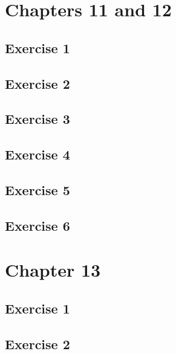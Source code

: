 \documentclass[a4paper,12pt,oneside]{book}
\begin{document}
\hypertarget{chapters-11-and-12}{%
\section{Chapters 11 and 12}\label{chapters-11-and-12}}

\hypertarget{exercise-1-6}{%
\subsection{Exercise 1}\label{exercise-1-6}}

\hypertarget{exercise-2-6}{%
\subsection{Exercise 2}\label{exercise-2-6}}

\hypertarget{exercise-3-6}{%
\subsection{Exercise 3}\label{exercise-3-6}}

\hypertarget{exercise-4-4}{%
\subsection{Exercise 4}\label{exercise-4-4}}

\hypertarget{exercise-5-2}{%
\subsection{Exercise 5}\label{exercise-5-2}}

\hypertarget{exercise-6-1}{%
\subsection{Exercise 6}\label{exercise-6-1}}

\hypertarget{chapter-13}{%
\section{Chapter 13}\label{chapter-13}}

\hypertarget{exercise-1-7}{%
\subsection{Exercise 1}\label{exercise-1-7}}

\hypertarget{exercise-2-7}{%
\subsection{Exercise 2}\label{exercise-2-7}}
\end{document}
